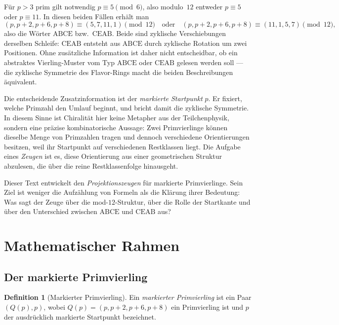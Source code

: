 \documentclass[11pt,a4paper]{article}
\theoremstyle{definition}
\newtheorem{definition}{Definition}[section]
\theoremstyle{plain}
\begin{document}
	Für $p>3$ prim gilt notwendig $p\equiv 5\pmod 6$, also modulo~$12$ entweder $p\equiv 5$ oder $p\equiv 11$. In diesen beiden Fällen erhält man
	\[
	(p,p+2,p+6,p+8)\equiv(5,7,11,1)\pmod{12}
	\quad\text{oder}\quad
	(p,p+2,p+6,p+8)\equiv(11,1,5,7)\pmod{12},
	\]
	also die Wörter $\mathrm{ABCE}$ bzw.\ $\mathrm{CEAB}$. Beide sind zyklische Verschiebungen derselben Schleife: $\mathrm{CEAB}$ entsteht aus $\mathrm{ABCE}$ durch zyklische Rotation um zwei Positionen. Ohne zusätzliche Information ist daher nicht entscheidbar, ob ein abstraktes Vierling-Muster vom Typ $\mathrm{ABCE}$ oder $\mathrm{CEAB}$ gelesen werden soll --- die zyklische Symmetrie des Flavor-Rings macht die beiden Beschreibungen äquivalent.
	
	Die entscheidende Zusatzinformation ist der \emph{markierte Startpunkt} $p$. Er fixiert, welche Primzahl den Umlauf beginnt, und bricht damit die zyklische Symmetrie. In diesem Sinne ist Chiralität hier keine Metapher aus der Teilchenphysik, sondern eine präzise kombinatorische Aussage: Zwei Primvierlinge können dieselbe Menge von Primzahlen tragen und dennoch verschiedene Orientierungen besitzen, weil ihr Startpunkt auf verschiedenen Restklassen liegt. Die Aufgabe eines \emph{Zeugen} ist es, diese Orientierung aus einer geometrischen Struktur abzulesen, die über die reine Restklassenfolge hinausgeht.
	
	Dieser Text entwickelt den \emph{Projektionszeugen} für markierte Primvierlinge. Sein Ziel ist weniger die Aufzählung von Formeln als die Klärung ihrer Bedeutung: Was sagt der Zeuge über die mod-$12$-Struktur, über die Rolle der Startkante und über den Unterschied zwischen $\mathrm{ABCE}$ und $\mathrm{CEAB}$ aus?
	
	\section{Mathematischer Rahmen}
	
	\subsection{Der markierte Primvierling}
	
	\begin{definition}[Markierter Primvierling]
		Ein \emph{markierter Primvierling} ist ein Paar $(Q(p),p)$, wobei $Q(p)=(p,p+2,p+6,p+8)$ ein Primvierling ist und $p$ der ausdrücklich markierte Startpunkt bezeichnet.
	\end{definition}
	
\end{document}
